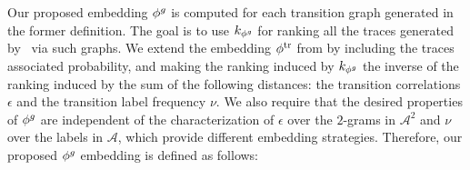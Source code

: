 {Our proposed embedding ${\phi^{g}}$ is computed for each transition graph generated in the former definition. The goal is to use
$k_{{\phi^{g}}}$ for ranking all the traces generated by \unravelling\ via such graphs. We extend the embedding ${\phi^{\text{tr}}}$ from \cite{LodhiSSCW02} by including the traces associated probability, and making the ranking induced by $k_{{\phi^{g}}}$ the inverse of the ranking induced by the
sum of the following distances: the transition correlations $\epsilon$ and the transition label frequency $\nu$.}
{We also require that the desired properties of ${\phi^{g}}$ are independent of the characterization of $\epsilon$ over the $2$-grams in $\mathcal{A}^2$ and $\nu$ over the labels in $\mathcal{A}$, which  provide different embedding strategies. } Therefore, our proposed ${\phi^{g}}$ embedding is defined as follows:


